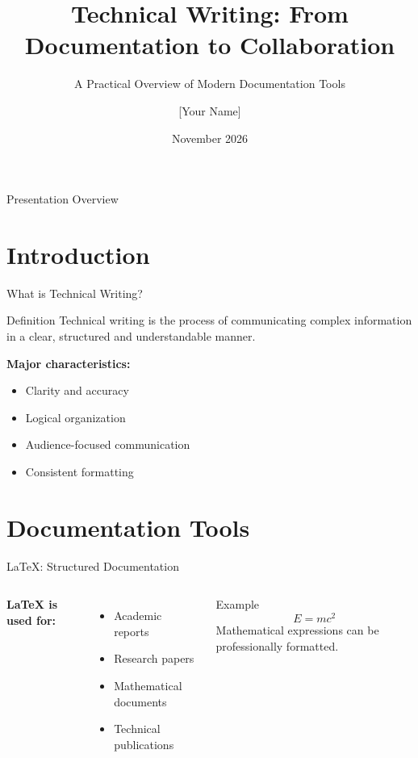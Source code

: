 \documentclass[aspectratio=169,11pt]{beamer}
\title[Technical Writing]{Technical Writing: From Documentation to Collaboration}
\subtitle{A Practical Overview of Modern Documentation Tools}
\author{[Your Name]}
\institute{Technical Writing Course}
\date{November 2026}
\begin{document}
\begin{frame}
    \titlepage
\end{frame}

\begin{frame}{Presentation Overview}
    \tableofcontents
\end{frame}

\section{Introduction}

\begin{frame}{What is Technical Writing?}
    \begin{block}{Definition}
        Technical writing is the process of communicating
        complex information in a clear, structured and
        understandable manner.
    \end{block}

    \vspace{0.3cm}

    \textbf{Major characteristics:}
    \begin{itemize}
        \item Clarity and accuracy
        \item Logical organization
        \item Audience-focused communication
        \item Consistent formatting
    \end{itemize}
\end{frame}

\section{Documentation Tools}

\begin{frame}{LaTeX: Structured Documentation}
    \begin{columns}

        \textbf{LaTeX is used for:}
        \begin{itemize}
            \item Academic reports
            \item Research papers
            \item Mathematical documents
            \item Technical publications
        \end{itemize}

        \begin{block}{Example}
            \[
                E = mc^2
            \]
            Mathematical expressions can be
            professionally formatted.
        \end{block}

    \end{columns}
\end{frame}
\end{document}
